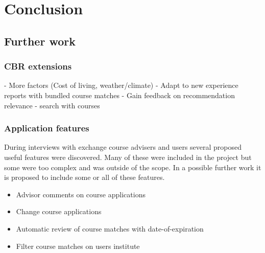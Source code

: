 
\chapter{Conclusion}

\section{Further work}

\subsection{CBR extensions}
- More factors (Cost of living, weather/climate)
- Adapt to new experience reports with bundled course matches
- Gain feedback on recommendation relevance
- search with courses

\subsection{Application features}
During interviews with exchange course advisers and users several proposed useful features were discovered. Many of these were included in the project but some were too complex and was outside of the scope. In a possible further work it is proposed to include some or all of these features. 


\begin{itemize}[noitemsep]
    \item Advisor comments on course applications
    \item Change course applications
    \item Automatic review of course matches with date-of-expiration
    \item Filter course matches on users institute
\end{itemize}

\cleardoublepage